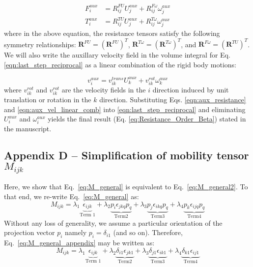 \documentclass{jfm}
\begin{document}
\begin{equation} \label{eqn:aux_resistance}
\begin{aligned}
    F_i^{aux} &= R_{ij}^{FU} U_j^{aux} + R_{ij}^{F\omega} \omega_j^{aux} \\
    T_i^{aux} &= R_{ij}^{TU} U_j^{aux} + R_{ij}^{T\omega} \omega_j^{aux}
\end{aligned}    
\end{equation}
where in the above equation, the resistance tensors satisfy the following symmetry relationships:  $\boldsymbol{R}^{FU} = (\boldsymbol{R}^{FU})^T$, $\boldsymbol{R}^{T\omega} = (\boldsymbol{R}^{T\omega})^T$, and $\boldsymbol{R}^{F\omega} = (\boldsymbol{R}^{TU})^T$.  We will also write the auxillary velocity field in the volume integral for Eq. \eqref{eqn:last_step_reciprocal} as a linear combination of the rigid body motions:

\begin{equation} \label{eqn:aux_vel_linear_comb}
    v_i^{aux} = v_{ik}^{trans} U_k^{aux} + v_{ik}^{rot} \omega_k^{aux}
\end{equation}
where $v_{ik}^{rot}$ and $v_{ik}^{rot}$ are the velocity fields in the $i$ direction induced by unit translation or rotation in the $k$ direction.  Substituting Eqs. \eqref{eqn:aux_resistance} and \eqref{eqn:aux_vel_linear_comb} into \eqref{eqn:last_step_reciprocal} and eliminating $U_i^{aux}$ and $\omega_i^{aux}$ yields the final result (Eq. \eqref{eq:Resistance_Order_Beta}) stated in the manuscript.

\subsection{Appendix D -- Simplification of mobility tensor $M_{ijk}$}
Here, we show that Eq.~\eqref{eq:M_general} is equivalent to Eq.~\eqref{eq:M_general2}. To that end, we re-write Eq.~\eqref{eq:M_general} as:
\begin{equation}
\label{eq:M_general_appendix}
    M_{ijk} =\lambda_1\underbrace{\epsilon_{ijk}}_{\text{Term 1}}+\lambda_2\underbrace{p_i\epsilon_{jkq}p_q}_{\text{Term2}}+\lambda_3\underbrace{p_j\epsilon_{ikq}p_q}_{\text{Term3}}+\lambda_4\underbrace{p_k\epsilon_{ijq}p_q}_{\text{Term4}}
\end{equation}
 Without any loss of generality, we assume a particular orientation of the projection vector $p_i$ namely $p_i =\delta_{i1}$ (and so on). Therefore, Eq.~\eqref{eq:M_general_appendix} may be written as:
 \begin{equation}
\label{eq:M_general_appendix}
    M_{ijk} =\lambda_1\underbrace{\epsilon_{ijk}}_{\text{Term 1}}+\lambda_2\underbrace{\delta_{i1}\epsilon_{jk1}}_{\text{Term2}}+\lambda_3\underbrace{\delta_{j1}\epsilon_{ik1}}_{\text{Term3}}+\lambda_4\underbrace{\delta_{k1}\epsilon_{ij1}}_{\text{Term4}}
\end{equation}
\end{document}
